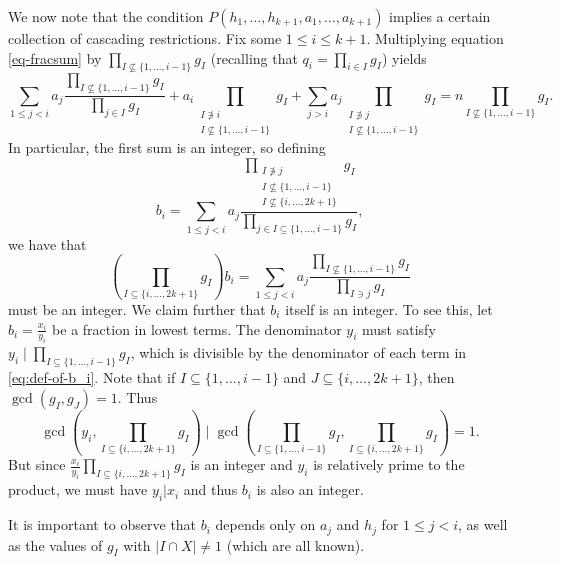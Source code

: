 \documentclass[11pt,letterpaper]{amsart}
\newcommand{\abs}[1]{\left\lvert #1\right\rvert}
\newcommand{\brac}[1]{\left( #1\right)}
\newcommand{\ogcd}[2]{\gcd(#1,#2)}
\newcommand{\bracgcd}[2]{\gcd\brac{#1,#2}}
\theoremstyle{definition}
\begin{document}
We now note that the condition $P(h_1,\ldots,h_{k+1}, a_1, \dots, a_{k+1})$ implies a certain collection of cascading restrictions. Fix some $1\leq i\leq k+1$. Multiplying equation \eqref{eq-fracsum} by $\prod_{I \not\subseteq \{1, \dots, i-1\}} g_I$ (recalling that $q_i=\prod_{i\in I}g_I$) yields
\begin{equation} \label{eq:general-sum-multiplied-up-to-i}\sum_{1\leq j<i}a_j\frac{\prod_{I \not\subseteq \{1, \dots, i-1\}} g_I}{\prod_{j\in I}g_I}+a_i\prod_{\substack{I \not\ni i\\ I\not\subseteq \{1, \dots, i-1\}}} g_I+\sum_{j>i}a_j\prod_{\substack{I \not\ni j\\ I\not\subseteq \{1, \dots, i-1\}}} g_I=n\prod_{I\not\subseteq \{1,\ldots,i-1\}}g_I.
\end{equation}
In particular, the first sum is an integer, so defining
\begin{equation}\label{eq:def-of-b_i}
    b_i=\sum_{1\leq j<i}a_j \frac{\prod_{\substack{I \not\ni j \\ I \not\subseteq \{1, \dots, i-1\}\\ I\not\subseteq \{i,\ldots,2k+1\}}}g_I}{\prod_{j \in I \subseteq \{1, \dots, i-1\}} g_I },
\end{equation}
we have that
\[\brac{\prod_{I\subseteq \{i,\ldots,2k+1\}}g_I}b_i=\sum_{1\leq j<i}a_j\frac{\prod_{I \not\subseteq \{1, \dots, i-1\}} g_I}{\prod_{I \ni j}g_I}\]
must be an integer. We claim further that $b_i$ itself is an integer. To see this, let $b_i = \frac{x_i}{y_i}$ be a fraction in lowest terms. The denominator $y_i$ must satisfy $y_i \mid\prod_{I \subseteq \{1, \ldots, i-1\}} g_I$, which is divisible by the denominator of each term in \eqref{eq:def-of-b_i}. Note that if $I \subseteq \{1, \ldots,i-1\}$ and $J \subseteq \{i, \ldots, 2k+1\}$, then $\ogcd{g_I}{g_J} = 1$. Thus
\[\bracgcd{y_i}{\prod_{I \subseteq \{i,\ldots,2k+1\}}g_I} \mid \bracgcd{\prod_{I \subseteq \{1, \ldots, i-1\}}g_I}{\prod_{I \subseteq \{i,\ldots,2k+1\}} g_I } = 1.  \]
But since $\frac{x_i}{y_i} \prod_{I \subseteq \{i, \ldots, 2k+1\}} g_I$ is an integer and $y_i$ is relatively prime to the product, we must have $y_i |x_i$ and thus $b_i$ is also an integer.

It is important to observe that $b_i$ depends only on $a_j$ and $h_j$ for $1\leq j<i$, as well as the values of $g_I$ with $\abs{I\cap X}\neq 1$ (which are all known).
\end{document}
